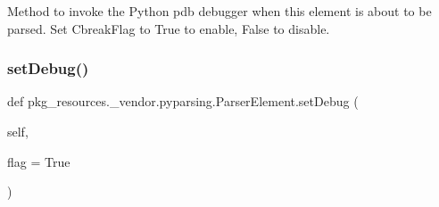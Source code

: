 \begin{DoxyVerb}Method to invoke the Python pdb debugger when this element is
   about to be parsed. Set C{breakFlag} to True to enable, False to
   disable.
\end{DoxyVerb}
 \mbox{\label{classpkg__resources_1_1__vendor_1_1pyparsing_1_1ParserElement_a40898433962bb7ed5fb13e32e924bd0e}} 
\subsubsection{\texorpdfstring{set\+Debug()}{setDebug()}}
{\footnotesize\ttfamily def pkg\+\_\+resources.\+\_\+vendor.\+pyparsing.\+Parser\+Element.\+set\+Debug (\begin{DoxyParamCaption}\item[{}]{self,  }\item[{}]{flag = {\ttfamily True} }\end{DoxyParamCaption})}


